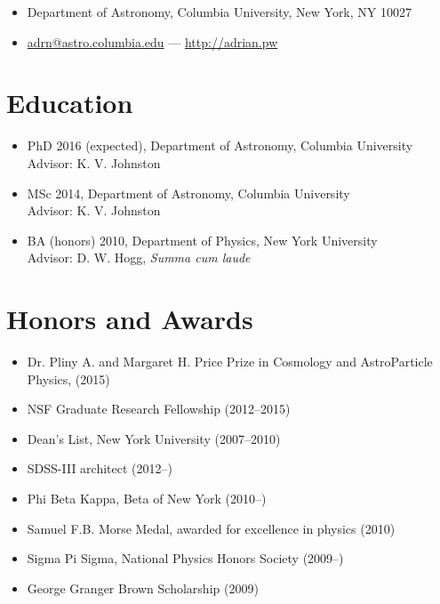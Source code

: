 \documentclass[12pt,letterpaper]{article}
\begin{document}
\thispagestyle{empty}\sloppy\sloppypar

{\huge \name}

\begin{itemize}
  \item Department of Astronomy, Columbia University, New York, NY 10027
  \item \href{mailto:adrn@astro.columbia.edu}{adrn@astro.columbia.edu} ---
		\href{http://adrian.pw}{http://adrian.pw}
\end{itemize}

\section*{Education}
	\begin{itemize}
	\item PhD 2016 (expected), Department of Astronomy, Columbia University\\
		{Advisor: K. V. Johnston}
	\item MSc 2014, Department of Astronomy, Columbia University\\
		{Advisor: K. V. Johnston}
	\item BA (honors) 2010, Department of Physics, New York University\\
		{Advisor: D. W. Hogg, \emph{Summa cum laude}}
	\end{itemize}

\section*{Honors and Awards}
	\begin{itemize}
        \item Dr. Pliny A. and Margaret H. Price Prize in Cosmology and AstroParticle Physics, (2015)
	\item NSF Graduate Research Fellowship (2012--2015)
	\item Dean's List, New York University (2007--2010)
	\item SDSS-III architect (2012--)
	\item Phi Beta Kappa, Beta of New York (2010--)
	\item Samuel F.B. Morse Medal, awarded for excellence in physics (2010)
	\item Sigma Pi Sigma, National Physics Honors Society (2009--)
	\item George Granger Brown Scholarship (2009)
	\end{itemize}
\end{document}
